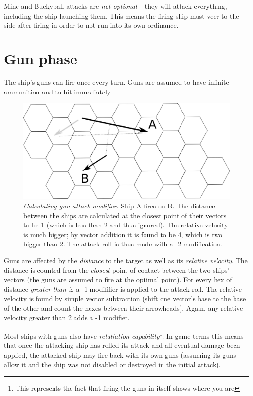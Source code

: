 \documentclass[a4paper,12pt,notitlepage,twocolumn]{article}
\begin{document}
Mine and Buckyball attacks are \emph{not optional} -- they will attack everything,
including the ship launching them. This means the firing ship must
veer to the side after firing in order to not run into its own ordinance.


\section{Gun phase}

The ship's guns can fire once every turn. Guns are assumed to have infinite ammunition
and to hit immediately. 
\begin{figure}[h!]\centering 
  \includegraphics[width=0.5 \textwidth]{data/combat_2.eps}
  \caption{\footnotesize \emph{Calculating gun attack modifier}. Ship A fires
    on B. The distance
    between the ships are calculated at the closest point of their
    vectors to be 1 (which is less than 2 and thus ignored). The relative velocity is much bigger; by vector
    addition it is found to be 4, which is two bigger than 2. The
    attack roll is thus made with a -2 modification. } 
\label{fig:11}
\end{figure}

Guns are affected by the \emph{distance} to the target as well as its
\emph{relative velocity}. The distance is counted from 
the \emph{closest} point of contact between the two ships'
vectors (the guns are assumed to fire at the optimal point). For every hex of 
distance \emph{greater than 2}, a -1 modififier
is applied to the attack roll. The relative velocity is found by
simple vector subtraction (shift one vector's base to the base of the
other and count the hexes between their arrowheads). Again, any
relative velocity greater than 2 adds a -1 modifier. 

Most ships with guns also have \emph{retaliation
  capability}\footnote{This represents the fact that firing the guns in 
  itself shows where you are}. In game terms this means that 
  once the attacking ship has rolled its attack and all eventual damage been applied, 
  the attacked ship may fire back with its own guns (assuming its guns 
  allow it and the ship was not disabled or destroyed in the initial attack).   
\end{document}

